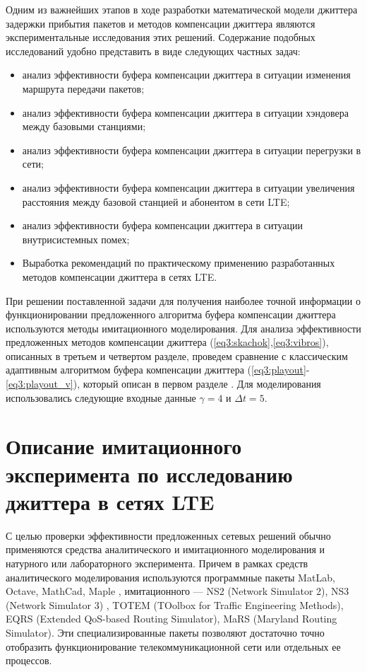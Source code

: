 Одним из важнейших этапов в ходе разработки математической модели джиттера задержки прибытия пакетов и методов компенсации джиттера являются экспериментальные исследования этих решений.
Содержание подобных исследований удобно представить в виде следующих частных задач:
\begin{itemize}
 \item анализ эффективности буфера компенсации джиттера в ситуации изменения маршрута передачи пакетов;
 \item анализ эффективности буфера компенсации джиттера в ситуации хэндовера между базовыми станциями;
 \item анализ эффективности буфера компенсации джиттера в ситуации перегрузки в сети;
 \item анализ эффективности буфера компенсации джиттера в ситуации увеличения расстояния между базовой станцией и абонентом в сети LTE;
 \item анализ эффективности буфера компенсации джиттера в ситуации внутрисистемных помех;
 \item Выработка рекомендаций по практическому применению разработанных методов компенсации джиттера в сетях LTE.
\end{itemize}
При решении поставленной задачи для получения наиболее точной информации о функционировании предложенного алгоритма буфера компенсации джиттера используются методы имитационного моделирования.
Для анализа эффективности предложенных методов компенсации джиттера (\ref{eq3:skachok},\ref{eq3:vibros}), описанных в третьем и четвертом разделе, проведем сравнение с классическим адаптивным алгоритмом буфера компенсации джиттера (\ref{eq3:playout}-\ref{eq3:playout_v}), который описан в первом разделе \cite{Ramjee}. 
Для моделирования использовались следующие входные данные $\gamma=4$ и $\Delta t=5$.


\section{Описание имитационного эксперимента по исследованию джиттера в сетях LTE}

С целью проверки эффективности предложенных сетевых решений обычно применяются средства аналитического и имитационного моделирования и натурного или лабораторного эксперимента.
Причем в рамках средств аналитического моделирования используются программные пакеты MatLab, Octave, MathCad, Maple \cite{matlab,octave,mathcad,maple}, 
имитационного --- NS2 (Network Simulator 2), NS3 (Network Simulator 3) \cite{ns3}, TOTEM (TOolbox for Traffic Engineering Methods), 
EQRS (Extended QoS-based Routing Simulator), MaRS (Maryland Routing Simulator).
Эти специализированные пакеты позволяют достаточно точно отобразить функционирование телекоммуникационной сети или отдельных ее процессов.

